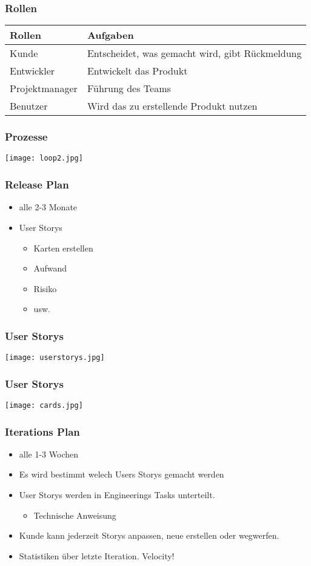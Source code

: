 \documentclass[compress, blue]{beamer}
\begin{document}
\begin{frame}\frametitle{Rollen}
  \begin{tabular}{l l}
    \hline
    Rollen & Aufgaben \\
    \hline
    Kunde & Entscheidet, was gemacht wird, gibt Rückmeldung \\
    Entwickler &  Entwickelt das Produkt \\
    Projektmanager & Führung des Teams \\
    Benutzer & Wird das zu erstellende Produkt nutzen \\
    \hline
  \end{tabular}
\end{frame}

\begin{frame}\frametitle{Prozesse}
  \texttt{[image: loop2.jpg]}
\end{frame}

\begin{frame}\frametitle{Release Plan}
  \begin{itemize}
  \item alle 2-3 Monate
  \item User Storys
    \begin{itemize}
    \item Karten erstellen
    \item Aufwand
    \item Risiko
    \item usw.
    \end{itemize}
  \end{itemize}
\end{frame}

\begin{frame}\frametitle{User Storys}
    \texttt{[image: userstorys.jpg]}
\end{frame}

\begin{frame}\frametitle{User Storys}
    \texttt{[image: cards.jpg]}
\end{frame}

\begin{frame}\frametitle{Iterations Plan}
  \begin{itemize}
  \item alle 1-3 Wochen
  \item Es wird bestimmt welech Users Storys gemacht werden
  \item User Storys werden in Engineerings Tasks unterteilt.
    \begin{itemize}
    \item Technische Anweisung
    \end{itemize}
  \item Kunde kann jederzeit Storys anpassen, neue erstellen oder
    wegwerfen.
  \item Statistiken über letzte Iteration. Velocity!
  \end{itemize}
\end{frame}
\end{document}
